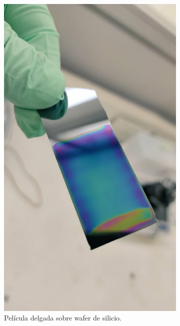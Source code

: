 \begin{figure}[!htpb]
     \centering
     \begin{subfigure}[b]{0.4\textwidth}
         \centering
         \includegraphics[width=.7\textwidth]{./Figures/muestra_1.pdf}
         \caption{Película delgada sobre wafer de silicio.}
         \label{fig:muestra_1}
     \end{subfigure}
     \hfill
     \begin{subfigure}[b]{0.4\textwidth}
         \centering

\end{subfigure}
\end{figure}
